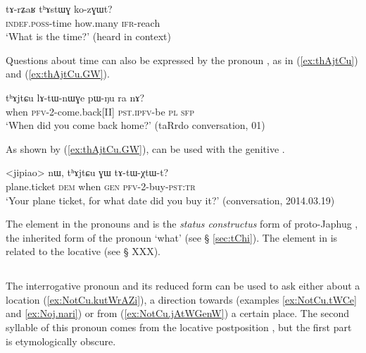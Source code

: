  \begin{exe}
\ex \label{ex:thAstWG.kozGWt}
 \gll   tɤ-rʑaʁ 	tʰɤstɯɣ ko-zɣɯt? \\
  \textsc{indef.poss}-time how.many  \textsc{ifr}-reach \\
  \glt `What is the time?' (heard in context)
  \end{exe} 
    
Questions about time can also be expressed by the pronoun , as in  (\ref{ex:thAjtCu}) and (\ref{ex:thAjtCu.GW}).

\begin{exe}
\ex \label{ex:thAjtCu}
\gll  tʰɤjtɕu 	lɤ-tɯ-nɯɣe 	pɯ-ŋu 	ra 	nɤ?    \\
 when \textsc{pfv}-2-come.back[II] \textsc{pst.ipfv}-be \textsc{pl} \textsc{sfp} \\
\glt  `When did you come back home?' (taRrdo conversation, 01)
\end{exe} 

As shown by (\ref{ex:thAjtCu.GW}),  can be used with the genitive .

\begin{exe}
\ex \label{ex:thAjtCu.GW}
\gll <jipiao> nɯ, tʰɤjtɕu ɣɯ tɤ-tɯ-χtɯ-t? \\
plane.ticket \textsc{dem} when \textsc{gen} \textsc{pfv}-2-buy-\textsc{pst}:\textsc{tr} \\
\glt `Your plane ticket, for what date did you buy it?' (conversation, 2014.03.19)
\end{exe} 

The element  in the pronouns   and  is the \textit{status constructus} form of proto-Japhug , the inherited form of the pronoun `what' (see § \ref{sec:tChi}). The element  in  is related to the locative  (see § XXX).

\subsection{} \label{sec:NotCu}

The interrogative pronoun  and its reduced form  can be used to ask either about a location (\ref{ex:NotCu.kutWrAZi}), a direction towards (examples \ref{ex:NotCu.tWCe} and \ref{ex:Noj.nari}) or from (\ref{ex:NotCu.jAtWGenW}) a certain place. The second syllable of this pronoun  comes from the locative postposition , but the first part is etymologically obscure.
 
